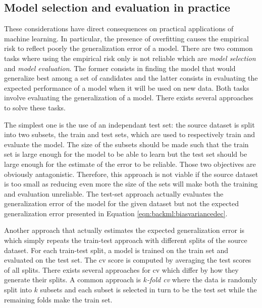 \subsection{Model selection and evaluation in practice}

These considerations have direct consequences on practical applications of machine
learning. In particular, the presence of overfitting causes the empirical risk to
reflect poorly the generalization error of a model. There are two common tasks
where using the empirical risk only is not reliable which are \textit{model selection}
and \textit{model evaluation}. The former consists in finding the model that would
generalize best among a set of candidates and the latter consists in evaluating
the expected performance of a model when it will be used on new data. Both tasks
involve evaluating the generalization of a model. There exists several approaches
to solve these tasks.

The simplest one is the use of an independant test set: the source dataset is
split into two subsets, the train and test sets, which are used to respectively
train and evaluate the model. The size of the subsets should be made such that
the train set is large enough for the model to be able to learn but the test set
should be large enough for the estimate of the error to be reliable. Those two
objectives are obviously antagonistic. Therefore, this approach is not viable if
the source dataset is too small as reducing even more the size of the sets will
make both the training and evaluation unreliable. The test-set approach actually
evaluates the generalization error of the model for the given dataset but not the
expected generalization error presented in Equation \ref{eqn:backml:biasvariancedec}.

Another approach that actually estimates the expected generalization error is
 which simply repeats the train-test approach with different splits
of the source dataset. For each train-test split, a model is trained on the train
set and evaluated on the test set. The \acrlong{cv} score is computed by averaging
the test scores of all splits. There exists several approaches for \acrlong{cv}
which differ by how they generate their splits. A common approach is
\textit{$k$-fold \acrlong{cv}} where the data is randomly split into $k$ subsets
and each subset is selected in turn to be the test set while the remaining folds
make the train set.

